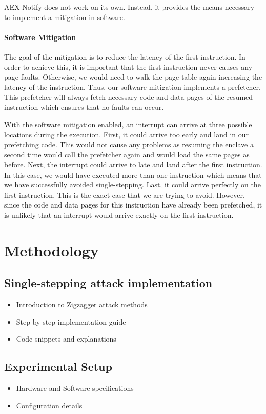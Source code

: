 \documentclass{llncs}
\begin{document}
AEX-Notify does not work on its own.
Instead, it provides the means necessary to implement a mitigation in software.

\paragraph{Software Mitigation}
The goal of the mitigation is to reduce the latency of the first instruction.
In order to achieve this, it is important that the first instruction never
causes any page faults.
Otherwise, we would need to walk the page table again increasing the latency of
the instruction.
Thus, our software mitigation implements a prefetcher.
This prefetcher will always fetch necessary code and data pages of the resumed
instruction which ensures that no faults can occur.

With the software mitigation enabled, an interrupt can arrive at three possible
locations during the execution.
First, it could arrive too early and land in our prefetching code.
This would not cause any problems as resuming the enclave a second time would
call the prefetcher again and would load the same pages as before.
Next, the interrupt could arrive to late and land after the first instruction.
In this case, we would have executed more than one instruction which means
that we have successfully avoided single-stepping.
Last, it could arrive perfectly on the first instruction.
This is the exact case that we are trying to avoid.
However, since the code and data pages for this instruction have already been prefetched,
it is unlikely that an interrupt would arrive exactly on the first instruction.

\section{Methodology}

\subsection{Single-stepping attack implementation}
\begin{itemize}
  \item Introduction to Zigzagger attack methods
  \item Step-by-step implementation guide
  \item Code snippets and explanations
\end{itemize}

\subsection{Experimental Setup}
\begin{itemize}
  \item Hardware and Software specifications
  \item Configuration details
\end{itemize}
\end{document}
